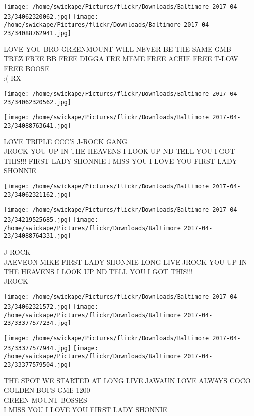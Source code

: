 \documentclass[10pt,letterpaper]{article}
\begin{document}
\vspace{0.25in}
\texttt{[image: /home/swickape/Pictures/flickr/Downloads/Baltimore 2017-04-23/34062320062.jpg]}
\texttt{[image: /home/swickape/Pictures/flickr/Downloads/Baltimore 2017-04-23/34088762941.jpg]}

LOVE YOU BRO GREENMOUNT WILL NEVER BE THE SAME GMB\\
TREZ FREE BB FREE DIGGA FRE MEME FREE ACHIE FREE T{-}LOW FREE BOOSE\\
:( RX
\pagebreak

\texttt{[image: /home/swickape/Pictures/flickr/Downloads/Baltimore 2017-04-23/34062320562.jpg]}

\vspace{0.25in}
\texttt{[image: /home/swickape/Pictures/flickr/Downloads/Baltimore 2017-04-23/34088763641.jpg]}

LOVE TRIPLE CCC'S J{-}ROCK GANG\\
JROCK YOU UP IN THE HEAVENS I LOOK UP ND TELL YOU I GOT THIS!!! FIRST LADY SHONNIE I MISS YOU I LOVE YOU FIRST LADY SHONNIE
\pagebreak

\texttt{[image: /home/swickape/Pictures/flickr/Downloads/Baltimore 2017-04-23/34062321162.jpg]}

\vspace{0.25in}
\texttt{[image: /home/swickape/Pictures/flickr/Downloads/Baltimore 2017-04-23/34219525685.jpg]}
\texttt{[image: /home/swickape/Pictures/flickr/Downloads/Baltimore 2017-04-23/34088764331.jpg]}

J{-}ROCK\\
JAEVEON MIKE FIRST LADY SHONNIE LONG LIVE JROCK YOU UP IN THE HEAVENS I LOOK UP ND TELL YOU I GOT THIS!!!\\
JROCK
\pagebreak

\texttt{[image: /home/swickape/Pictures/flickr/Downloads/Baltimore 2017-04-23/34062321572.jpg]}
\texttt{[image: /home/swickape/Pictures/flickr/Downloads/Baltimore 2017-04-23/33377577234.jpg]}

\texttt{[image: /home/swickape/Pictures/flickr/Downloads/Baltimore 2017-04-23/33377577944.jpg]}
\texttt{[image: /home/swickape/Pictures/flickr/Downloads/Baltimore 2017-04-23/33377579504.jpg]}

THE SPOT WE STARTED AT LONG LIVE JAWAUN LOVE ALWAYS COCO\\
GOLDEN BOI'S GMB 1200\\
GREEN MOUNT BOSSES\\
I MISS YOU I LOVE YOU FIRST LADY SHONNIE
\pagebreak
\end{document}

